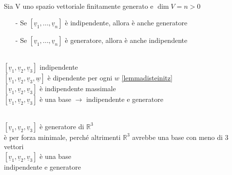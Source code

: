   \begin{lemma}\label{conselemmadisteinitz}
    Sia V uno spazio vettoriale finitamente generato e $\dim V=n>0$\\
    \begin{itemize}
      \item[-] Se $[\underline{v}_1,...,\underline{v}_n]$ è
        indipendente, allora è anche generatore
      \item[-] Se $[\underline{v}_1,...,\underline{v}_n]$ è
        generatore, allora è anche indipendente
    \end{itemize}
    \begin{dimostrazione}[INDIP=GEN]
      \phantom{}\\
      $[\underline{v}_1,\underline{v}_2,\underline{v}_3]$ indipendente\\
      $[\underline{v}_1,\underline{v}_2,\underline{v}_3,\underline{w}]$
      è dipendente per ogni $w$ \ref{lemmadisteinitz}\\
      $[\underline{v}_1,\underline{v}_2,\underline{v}_3]$ è
      indipendente massimale\\
      $[\underline{v}_1,\underline{v}_2,\underline{v}_3]$ è una base
      $\longrightarrow$ indipendente e generatore
    \end{dimostrazione}
    \begin{dimostrazione}[GEN=INDIP]
      \phantom{}\\
      $[\underline{v}_1,\underline{v}_2,\underline{v}_3]$ è
      generatore di $\mathbb{R}^3$\\
      è per forza minimale, perché altrimenti $\mathbb{R}^3$ avrebbe
      una base con meno di 3 vettori\\
      $[\underline{v}_1,\underline{v}_2,\underline{v}_3]$ è una base\\
      indipendente e generatore
    \end{dimostrazione}
  \end{lemma}

